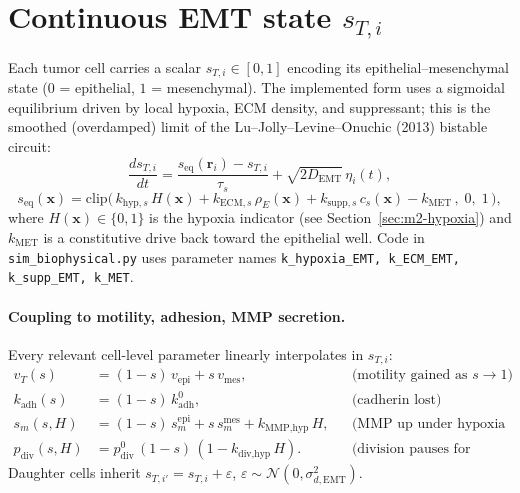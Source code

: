 \documentclass[11pt,letterpaper]{article}
\begin{document}
\section{Continuous EMT state $s_{T,i}$}
\label{sec:m2-emt}

Each tumor cell carries a scalar $s_{T,i} \in [0,1]$ encoding its
epithelial--mesenchymal state ($0$ = epithelial, $1$ = mesenchymal).
The implemented form uses a sigmoidal equilibrium driven by local
hypoxia, ECM density, and suppressant; this is the smoothed (overdamped)
limit of the Lu--Jolly--Levine--Onuchic (2013) bistable circuit:
\begin{equation}
\boxed{\;
\frac{d s_{T,i}}{dt} = \frac{s_{\text{eq}}(\mathbf{r}_i) - s_{T,i}}{\tau_s}
   + \sqrt{2 D_{\text{EMT}}}\,\eta_i(t),
\;}
\label{eq:emt-implemented}
\end{equation}
\begin{equation}
s_{\text{eq}}(\mathbf{x}) = \mathrm{clip}\!\bigl(\,k_{\text{hyp},s}\,H(\mathbf{x})
                              + k_{\text{ECM},s}\,\rho_E(\mathbf{x})
                              + k_{\text{supp},s}\,c_s(\mathbf{x})
                              - k_{\text{MET}}\,,\; 0,\; 1\,\bigr),
\label{eq:emt-eq}
\end{equation}
where $H(\mathbf{x}) \in \{0,1\}$ is the hypoxia indicator
(see Section~\ref{sec:m2-hypoxia}) and $k_{\text{MET}}$ is a
constitutive drive back toward the epithelial well. Code in
\texttt{sim\_biophysical.py} uses parameter names
\texttt{k\_hypoxia\_EMT, k\_ECM\_EMT, k\_supp\_EMT, k\_MET}.

\paragraph{Coupling to motility, adhesion, MMP secretion.}
Every relevant cell-level parameter linearly interpolates in $s_{T,i}$:
\begin{align}
v_T(s)              &= (1-s)\,v_{\text{epi}} + s\,v_{\text{mes}}, & &\text{(motility gained as }s \to 1\text{)}\\
k_{\text{adh}}(s)   &= (1-s)\,k_{\text{adh}}^{0}, & &\text{(cadherin lost)}\\
s_m(s, H)           &= (1-s)\,s_m^{\text{epi}} + s\,s_m^{\text{mes}} + k_{\text{MMP,hyp}}\,H, & &\text{(MMP up under hypoxia too)}\\
p_{\text{div}}(s, H) &= p_{\text{div}}^{0}\,(1-s)\,(1 - k_{\text{div,hyp}}\,H). & &\text{(division pauses for mesenchymal/hypoxic cells)}
\end{align}
Daughter cells inherit $s_{T,i'} = s_{T,i} + \varepsilon$,
$\varepsilon\sim\mathcal{N}(0,\sigma_{d,\text{EMT}}^2)$.
\end{document}
